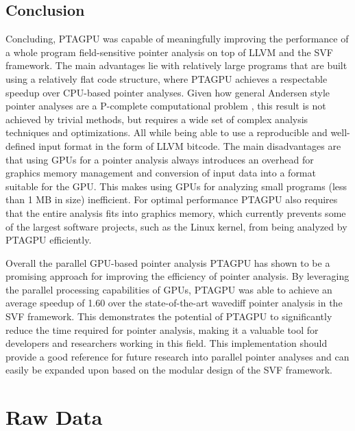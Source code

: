 \section{Conclusion}
Concluding, PTAGPU was capable of meaningfully improving the performance of a whole program field-sensitive pointer analysis on top of LLVM and the SVF framework.
The main advantages lie with relatively large programs that are built using a relatively flat code structure, where PTAGPU achieves a respectable speedup over CPU-based pointer analyses.
Given how general Andersen style pointer analyses are a P-complete computational problem \cite{mathiasen2021fine}, this result is not achieved by trivial methods, but requires a wide set of complex analysis techniques and optimizations. All while being able to use a reproducible and well-defined input format in the form of LLVM bitcode.
The main disadvantages are that using GPUs for a pointer analysis always introduces an overhead for graphics memory management and conversion of input data into a format suitable for the GPU.
This makes using GPUs for analyzing small programs (less than 1 MB in size) inefficient.
For optimal performance PTAGPU also requires that the entire analysis fits into graphics memory, which currently prevents some of the largest software projects, such as the Linux kernel, from being analyzed by PTAGPU efficiently.

Overall the parallel GPU-based pointer analysis PTAGPU has shown to be a promising approach for improving the efficiency of pointer analysis. By leveraging the parallel processing capabilities of GPUs, PTAGPU was able to achieve an average speedup of 1.60 over the state-of-the-art wavediff pointer analysis in the SVF framework. This demonstrates the potential of PTAGPU to significantly reduce the time required for pointer analysis, making it a valuable tool for developers and researchers working in this field.
This implementation should provide a good reference for future research into parallel pointer analyses and can easily be expanded upon based on the modular design of the SVF framework.
\appendix

\chapter{Raw Data}

